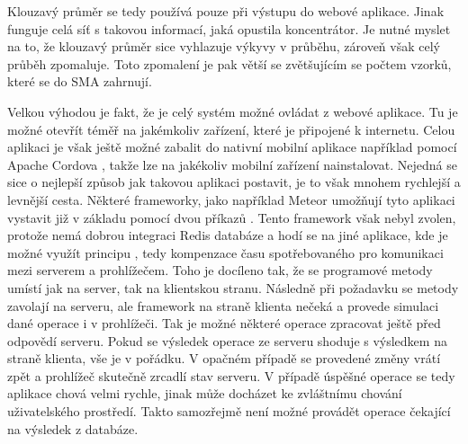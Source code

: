 Klouzavý průměr se tedy používá pouze při výstupu do webové aplikace. Jinak funguje celá síť s takovou informací, jaká opustila koncentrátor. Je nutné myslet na to, že klouzavý průměr sice vyhlazuje výkyvy v průběhu, zároveň však celý průběh zpomaluje. Toto zpomalení je pak větší se zvět\-šu\-jí\-cím se počtem vzorků, které se do SMA zahrnují.

Velkou výhodou je fakt, že je celý systém možné ovládat z webové aplikace. Tu je možné otevřít téměř na jakémkoliv zařízení, které je připojené k internetu. Celou aplikaci je však ještě možné zabalit do nativní mobilní aplikace například pomocí Apache Cordova \cite{cordova}, takže lze na jakékoliv mobilní zařízení nainstalovat.  Nejedná se sice o nejlepší způsob jak takovou aplikaci postavit, je to však mnohem rychlejší a levnější cesta. Některé frameworky, jako například Meteor umožňují tyto aplikaci vystavit již v základu pomocí dvou příkazů \cite{meteor}. Tento framework však nebyl zvolen, protože nemá dobrou integraci Redis \cite{redis} databáze a hodí se na jiné aplikace, kde je možné využít principu ,  tedy kompenzace času spotřebovaného pro komunikaci mezi serverem a prohlížečem. Toho je docíleno tak, že se programové metody umístí jak na server, tak na klientskou stranu. Následně při požadavku se metody zavolají na serveru, ale framework na straně klienta nečeká a provede simulaci dané operace i v prohlížeči. Tak je možné některé operace zpracovat ještě před odpovědí serveru. Pokud se výsledek operace ze serveru shoduje s výsledkem na straně klienta, vše je v pořádku. V opačném případě se provedené změny vrátí zpět a prohlížeč skutečně zrcadlí stav serveru. V případě úspěšné operace se tedy aplikace chová velmi rychle, jinak může docházet ke zvláštnímu chování uživatelského prostředí. Takto samozřejmě není možné provádět operace čekající na výsledek z databáze.